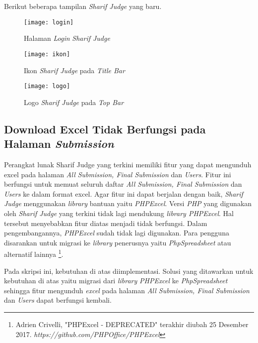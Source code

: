Berikut beberapa tampilan \textit{Sharif Judge} yang baru.
\begin{figure}[H]
	\centering  
	\texttt{[image: login]}  
	\caption[Halaman \textit{Login} \textit{Sharif Judge}]{Halaman \textit{Login} \textit{Sharif Judge}} 
	\label{fig:login} 
\end{figure}

\begin{figure}[H]
	\centering  
	\texttt{[image: ikon]}  
	\caption[Ikon \textit{Sharif Judge} pada \textit{Title Bar}]{Ikon \textit{Sharif Judge} pada \textit{Title Bar}} 
	\label{fig:ikon} 
\end{figure} 

\begin{figure}[H]
	\centering  
	\texttt{[image: logo]}  
	\caption[Logo \textit{Sharif Judge} pada \textit{Top Bar}]{Logo \textit{Sharif Judge} pada \textit{Top Bar}} 
	\label{fig:logo} 
\end{figure} 

\subsection{Download Excel Tidak Berfungsi pada Halaman \textit{Submission}}
Perangkat lunak Sharif Judge yang terkini memiliki fitur yang dapat mengunduh excel pada halaman \textit{All Submission, Final Submission} dan \textit{Users}. Fitur ini berfungsi untuk memuat seluruh daftar \textit{All Submission, Final Submission} dan \textit{Users} ke dalam format excel. Agar fitur ini dapat berjalan dengan baik, \textit{Sharif Judge} menggunakan \textit{library} bantuan yaitu \textit{PHPExcel}. Versi \textit{PHP} yang digunakan oleh \textit{Sharif Judge} yang terkini tidak lagi mendukung \textit{library PHPExcel}. Hal tersebut menyebabkan fitur diatas menjadi tidak berfungsi. Dalam pengembangannya, \textit{PHPExcel} sudah tidak lagi digunakan. Para pengguna disarankan untuk migrasi ke \textit{library} penerusnya yaitu \textit{PhpSpreadsheet} atau alternatif lainnya \footnote{Adrien Crivelli, "PHPExcel - DEPRECATED" terakhir diubah 25 Desember 2017. \textit{https://github.com/PHPOffice/PHPExcel}}.

Pada skripsi ini, kebutuhan di atas diimplementasi. Solusi yang ditawarkan untuk kebutuhan di atas yaitu migrasi dari \textit{library} \textit{PHPExcel} ke \textit{PhpSpreadsheet} sehingga fitur mengunduh \textit{excel} pada halaman \textit{All Submission, Final Submission} dan \textit{Users} dapat berfungsi kembali.
\pagebreak

